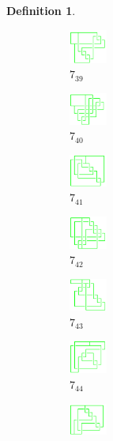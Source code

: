 \documentclass{article}
\theoremstyle{definition}
\newtheorem{defn}[thm]{Definition}
\theoremstyle{theorem}
\theoremstyle{proposition}
\theoremstyle{corollary}
\begin{document}
\begin{defn}
\begin{figure}[H]
\begin{subfigure}{0.075\textwidth}
    \includegraphics[width=1.25cm]{../Midterm_Poster/grid_diagram/theta_7_39.png}
    \caption{$7_{39}$} 
    \end{subfigure}
    \begin{subfigure}{0.075\textwidth}
    \includegraphics[width=1.25cm]{../Midterm_Poster/grid_diagram/theta_7_40.png}
    \caption{$7_{40}$} 
    \end{subfigure}
    \begin{subfigure}{0.075\textwidth}
    \includegraphics[width=1.25cm]{../Midterm_Poster/grid_diagram/theta_7_41.png}
    \caption{$7_{41}$} 
    \end{subfigure}
    \begin{subfigure}{0.075\textwidth}
    \includegraphics[width=1.25cm]{../Midterm_Poster/grid_diagram/theta_7_42.png}
    \caption{$7_{42}$} 
    \end{subfigure}
    \begin{subfigure}{0.075\textwidth}
    \includegraphics[width=1.25cm]{../Midterm_Poster/grid_diagram/theta_7_43.png}
    \caption{$7_{43}$} 
    \end{subfigure}
    \begin{subfigure}{0.075\textwidth}
    \includegraphics[width=1.25cm]{../Midterm_Poster/grid_diagram/theta_7_44.png}
    \caption{$7_{44}$} 
    \end{subfigure}
    \begin{subfigure}{0.075\textwidth}
    \includegraphics[width=1.25cm]{../Midterm_Poster/grid_diagram/theta_7_45.png}

\end{subfigure}
\end{figure}
\end{defn}
\end{document}
